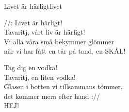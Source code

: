 \begin{song}{Livet är härligt}{livet}
\begin{vers}
//: Livet är härligt!\\
Tavaritj, vårt liv är härligt!\\
Vi alla våra små bekymmer glömmer\\
när vi har fått en tår på tand, en SKÅL!\\
\end{vers}
\begin{vers}
Tag dig en vodka!\\
Tavaritj, en liten vodka!\\
Glasen i botten vi tillsammans tömmer,\\
det kommer mera efter hand ://\\
HEJ!\\
\end{vers}
\end{song}
